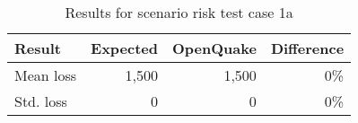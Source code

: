 \begin{table}[htbp]

\centering
\begin{tabular}{ l r r r }

\hline
\rowcolor{anti-flashwhite}
\bf{Result} & \bf{Expected} & \bf{OpenQuake} & \bf{Difference}\\
\hline
Mean loss & 1,500 & 1,500 & 0\% \\
Std. loss & 0 & 0 & 0\% \\
\hline
\end{tabular}

\caption{Results for scenario risk test case 1a}
\label{tab:result-scenario-risk-1a}
\end{table}